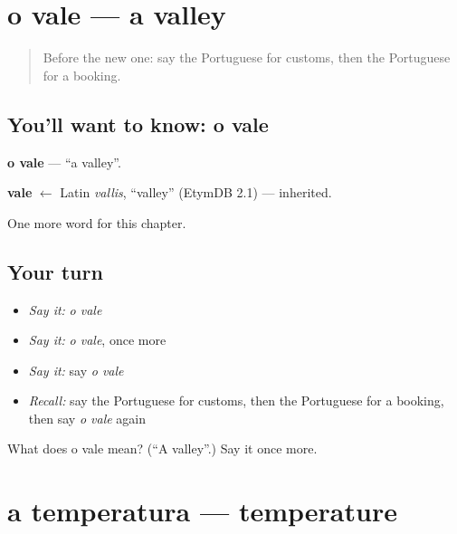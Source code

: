 \section[o vale]{o vale — a valley}

\label{lesson:PT-C244-vale}



\begin{quote}
Before the new one: say the Portuguese for customs, then the Portuguese for a booking.
\end{quote}

\subsection*{You'll want to know: o vale}
\textbf{o vale} — \textquotedblleft{}a valley\textquotedblright{}.

\begin{cousinweb}
\textbf{vale} $\leftarrow$ Latin \emph{vallis}, \textquotedblleft{}valley\textquotedblright{} (EtymDB 2.1) — inherited.
\end{cousinweb}

\begin{grammarlens}[title={What you've built}]
One more word for this chapter.
\end{grammarlens}

\subsection*{Your turn}
\begin{itemize}
\raggedright
  \item \emph{Say it:} \emph{o vale}
  \item \emph{Say it:} \emph{o vale}, once more
  \item \emph{Say it:} say \emph{o vale}
  \item \emph{Recall:} say the Portuguese for customs, then the Portuguese for a booking, then say \emph{o vale} again
\end{itemize}

\begin{tcolorbox}[breakable,colback=teal!4,colframe=teal!35!black,title={Before you move on}]
What does o vale mean? (\textquotedblleft{}A valley\textquotedblright{}.) Say it once more.
\end{tcolorbox}
\section[a temperatura]{a temperatura — temperature}

